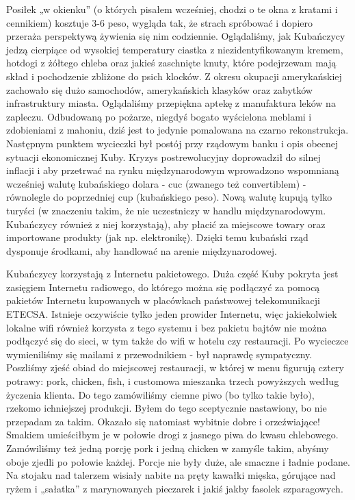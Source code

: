 Posiłek „w okienku” (o których pisałem wcześniej, chodzi o te okna z kratami i cennikiem) kosztuje 3-6 peso, wygląda tak, że strach spróbować i dopiero przeraża perspektywą żywienia się nim codziennie.
Oglądaliśmy, jak Kubańczycy jedzą cierpiące od wysokiej temperatury ciastka z niezidentyfikowanym kremem, hotdogi z żółtego chleba oraz jakieś zaschnięte knuty, które podejrzewam mają skład i pochodzenie zbliżone do psich klocków.
Z okresu okupacji amerykańskiej zachowało się dużo samochodów, amerykańskich klasyków oraz zabytków infrastruktury miasta.
Oglądaliśmy przepiękna aptekę z manufaktura leków na zapleczu.
Odbudowaną po pożarze, niegdyś bogato wyścielona meblami i zdobieniami z mahoniu, dziś jest to jedynie pomalowana na czarno rekonstrukcja.
Następnym punktem wycieczki był postój przy rządowym banku i opis obecnej sytuacji ekonomicznej Kuby.
Kryzys postrewolucyjny doprowadził do silnej inflacji i aby przetrwać na rynku międzynarodowym wprowadzono wspomnianą wcześniej walutę kubańskiego dolara - cuc (zwanego też convertiblem) - równolegle do poprzedniej cup (kubańskiego peso).
Nową walutę kupują tylko turyści (w znaczeniu takim, że nie uczestniczy w handlu międzynarodowym. Kubańczycy również z niej korzystają), aby płacić za miejscowe towary oraz importowane produkty (jak np.
elektronikę). Dzięki temu kubański rząd dysponuje środkami, aby handlować na arenie międzynarodowej.
\par Kubańczycy korzystają z Internetu pakietowego.
Duża część Kuby pokryta jest zasięgiem Internetu radiowego, do którego można się podłączyć za pomocą pakietów Internetu kupowanych w placówkach państwowej telekomunikacji ETECSA.
Istnieje oczywiście tylko jeden prowider Internetu, więc jakiekolwiek lokalne wifi również korzysta z tego systemu i bez pakietu bajtów nie można podłączyć się do sieci, w tym także do wifi w hotelu czy restauracji.
Po wycieczce wymieniliśmy się mailami z przewodnikiem - był naprawdę sympatyczny.
Poszliśmy zjeść obiad do miejscowej restauracji, w której w menu figurują cztery potrawy: pork, chicken, fish, i customowa mieszanka trzech powyższych według życzenia klienta.
Do tego zamówiliśmy ciemne piwo (bo tylko takie było), rzekomo ichniejszej produkcji.
Byłem do tego sceptycznie nastawiony, bo nie przepadam za takim.
Okazało się natomiast wybitnie dobre i orzeźwiające!
Smakiem umieściłbym je w połowie drogi z jasnego piwa do kwasu chlebowego.
Zamówiliśmy też jedną porcję pork i jedną chicken w zamyśle takim, abyśmy oboje zjedli po połowie każdej.
Porcje nie były duże, ale smaczne i ładnie podane. Na stojaku nad talerzem wisiały nabite na pręty kawałki mięska, górujące nad ryżem i „sałatka” z marynowanych pieczarek i jakiś jakby fasolek szparagowych.
